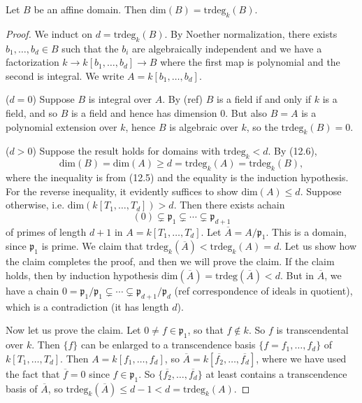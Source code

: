 \documentclass[12pt]{article}
\begin{document}
\begin{theorem}
	Let $B$ be an affine domain. Then $\text{dim}(B)=\text{trdeg}_k(B)$.
\end{theorem}
\begin{proof}
	We induct on $d=\text{trdeg}_k(B)$. By Noether normalization, there exists $b_1,\dots,b_d\in B$ such that the $b_i$ are algebraically independent and we have a factorization $k\to k[b_1,\dots,b_d]\to B$ where the first map is polynomial and the second is integral. We write $A=k[b_1,\dots,b_d]$.

	($d=0$) Suppose $B$ is integral over $A$. By (ref) $B$ is a field if and only if $k$ is a field, and so $B$ is a field and hence has dimension 0. But also $B=A$ is a polynomial extension over $k$, hence $B$ is algebraic over $k$, so the $\text{trdeg}_k(B)=0$.

	($d>0$) Suppose the result holds for domains with $\text{trdeg}_k < d$. By (12.6),
	\begin{equation*}
		\text{dim}(B)=\text{dim}(A)\geq d = \text{trdeg}_k(A) = \text{trdeg}_k(B),
	\end{equation*}
	where the inequality is from (12.5) and the equality is the induction hypothesis. For the reverse inequality, it evidently suffices to show $\text{dim}(A)\leq d$. Suppose otherwise, i.e. $\text{dim}(k[T_1,\dots,T_d])>d$. Then there exists  achain 
	\begin{equation*}
		(0) \subsetneq \mathfrak{p}_1\subsetneq\cdots\subsetneq\mathfrak{p}_{d+1}
	\end{equation*}
	of primes of length $d+1$ in $A=k[T_1,\dots,T_d]$. Let $\overline{A}=A/\mathfrak{p}_1$. This is a domain, since $\mathfrak{p}_1$ is prime. We claim that $\text{trdeg}_k(\overline{A})<\text{trdeg}_k(A)=d$. Let us show how the claim completes the proof, and then we will prove the claim. If the claim holds, then by induction hypothesis $\text{dim}(\overline{A})=\text{trdeg}(\overline{A})<d$. But in $\overline{A}$, we have a chain $0=\mathfrak{p}_1/\mathfrak{p}_1\subsetneq\cdots\subsetneq\mathfrak{p}_{d+1}/\mathfrak{p}_{d}$ (ref correspondence of ideals in quotient), which is a contradiction (it has length $d$).

	Now let us prove the claim. Let $0\neq f\in\mathfrak{p}_1$, so that $f\not\in k$. So $f$ is transcendental over $k$. Then $\{f\}$ can be enlarged to a transcendence basis $\{f=f_1,\dots,f_d\}$ of $k[T_1,\dots,T_d]$. Then $A=k[f_1,\dots,f_d]$, so $\overline{A}=k[\overline{f_2},\dots,\overline{f_d}]$, where we have used the fact that $\overline{f}=0$ since $f\in\mathfrak{p}_1$. So $\{\overline{f_2},\dots,\overline{f_d}\}$ at least contains a transcendence basis of $\overline{A}$, so $\text{trdeg}_k(\overline{A})\leq d-1<d=\text{trdeg}_k(A)$.
\end{proof}
\end{document}
